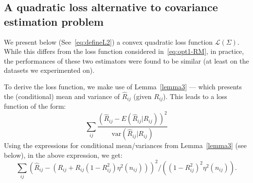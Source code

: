 \subsection*{A quadratic loss alternative to covariance estimation problem}




We present below (See~\eqref{eq:defineL2}) a convex quadratic loss function $\mathcal{L}(\Sigma)$. While this differs from the loss function considered in~\eqref{eq:opt1-RM}, in practice, the performances of these two estimators were found to be similar (at least on the datasets we experimented on). 

To derive the loss function, we make use of Lemma~\ref{lemma3} --- which presents the (conditional) mean and variance of $\hat{R}_{ij}$ (given $R_{ij}$). This leads to a loss function of the form:
$$\sum_{ij} \frac{(\hat{R}_{ij} - E (\hat{R}_{ij}| R_{ij}))^2}{\text{var}(\hat{R}_{ij}|R_{ij})}$$ 
Using the expressions for conditional mean/variances from Lemma~\ref{lemma3} (see below), in the above expression, we get:
$$\sum_{ij} {\left(\hat{R}_{ij} - \left (R_{ij} + R_{ij} (1 - R^2_{ij}) \eta^2 (n_{ij}) \right) \right)^2}/{((1 - R^2_{ij})^2 \eta^2 (n_{ij}))}.$$ 

